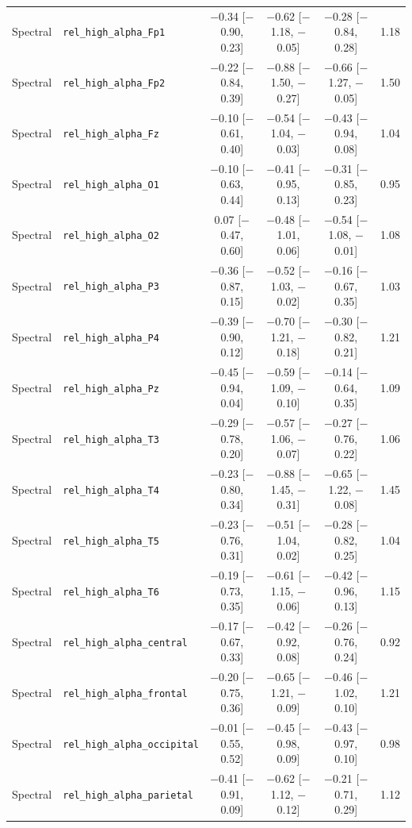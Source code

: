 {\begin{longtable}{llcccc}
Spectral & \texttt{rel\_high\_alpha\_Fp1} & $-$0.34 [$-$0.90, 0.23] & $-$0.62 [$-$1.18, $-$0.05] & $-$0.28 [$-$0.84, 0.28] & 1.18 \\
Spectral & \texttt{rel\_high\_alpha\_Fp2} & $-$0.22 [$-$0.84, 0.39] & $-$0.88 [$-$1.50, $-$0.27] & $-$0.66 [$-$1.27, $-$0.05] & 1.50 \\
Spectral & \texttt{rel\_high\_alpha\_Fz} & $-$0.10 [$-$0.61, 0.40] & $-$0.54 [$-$1.04, $-$0.03] & $-$0.43 [$-$0.94, 0.08] & 1.04 \\
Spectral & \texttt{rel\_high\_alpha\_O1} & $-$0.10 [$-$0.63, 0.44] & $-$0.41 [$-$0.95, 0.13] & $-$0.31 [$-$0.85, 0.23] & 0.95 \\
Spectral & \texttt{rel\_high\_alpha\_O2} & 0.07 [$-$0.47, 0.60] & $-$0.48 [$-$1.01, 0.06] & $-$0.54 [$-$1.08, $-$0.01] & 1.08 \\
Spectral & \texttt{rel\_high\_alpha\_P3} & $-$0.36 [$-$0.87, 0.15] & $-$0.52 [$-$1.03, $-$0.02] & $-$0.16 [$-$0.67, 0.35] & 1.03 \\
Spectral & \texttt{rel\_high\_alpha\_P4} & $-$0.39 [$-$0.90, 0.12] & $-$0.70 [$-$1.21, $-$0.18] & $-$0.30 [$-$0.82, 0.21] & 1.21 \\
Spectral & \texttt{rel\_high\_alpha\_Pz} & $-$0.45 [$-$0.94, 0.04] & $-$0.59 [$-$1.09, $-$0.10] & $-$0.14 [$-$0.64, 0.35] & 1.09 \\
Spectral & \texttt{rel\_high\_alpha\_T3} & $-$0.29 [$-$0.78, 0.20] & $-$0.57 [$-$1.06, $-$0.07] & $-$0.27 [$-$0.76, 0.22] & 1.06 \\
Spectral & \texttt{rel\_high\_alpha\_T4} & $-$0.23 [$-$0.80, 0.34] & $-$0.88 [$-$1.45, $-$0.31] & $-$0.65 [$-$1.22, $-$0.08] & 1.45 \\
Spectral & \texttt{rel\_high\_alpha\_T5} & $-$0.23 [$-$0.76, 0.31] & $-$0.51 [$-$1.04, 0.02] & $-$0.28 [$-$0.82, 0.25] & 1.04 \\
Spectral & \texttt{rel\_high\_alpha\_T6} & $-$0.19 [$-$0.73, 0.35] & $-$0.61 [$-$1.15, $-$0.06] & $-$0.42 [$-$0.96, 0.13] & 1.15 \\
Spectral & \texttt{rel\_high\_alpha\_central} & $-$0.17 [$-$0.67, 0.33] & $-$0.42 [$-$0.92, 0.08] & $-$0.26 [$-$0.76, 0.24] & 0.92 \\
Spectral & \texttt{rel\_high\_alpha\_frontal} & $-$0.20 [$-$0.75, 0.36] & $-$0.65 [$-$1.21, $-$0.09] & $-$0.46 [$-$1.02, 0.10] & 1.21 \\
Spectral & \texttt{rel\_high\_alpha\_occipital} & $-$0.01 [$-$0.55, 0.52] & $-$0.45 [$-$0.98, 0.09] & $-$0.43 [$-$0.97, 0.10] & 0.98 \\
Spectral & \texttt{rel\_high\_alpha\_parietal} & $-$0.41 [$-$0.91, 0.09] & $-$0.62 [$-$1.12, $-$0.12] & $-$0.21 [$-$0.71, 0.29] & 1.12 \\

\end{longtable}}
